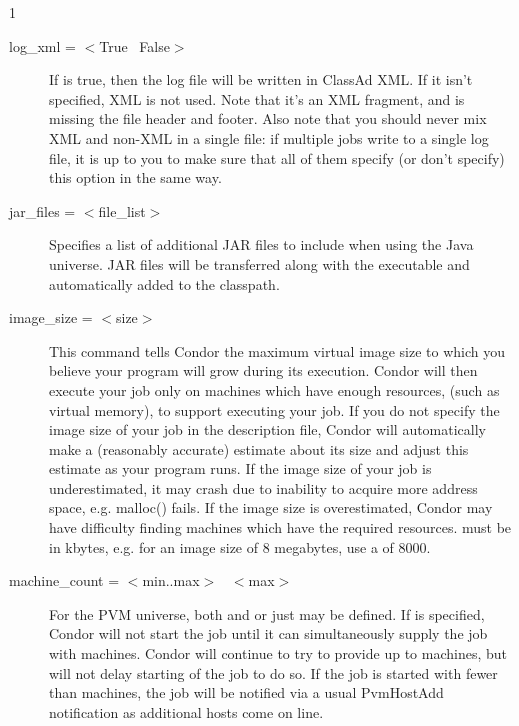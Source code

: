 \begin{ManPage}{\label{man-condor-submit}}{1}
\begin{description}
\item[log\_xml = $<$True \Bar\ False$>$] If  is true, 
then the log file will be written in ClassAd XML. If it isn't
specified, XML is not used. Note that it's an XML fragment, and is
missing the file header and footer. Also note that you should never
mix XML and non-XML in a single file: if multiple jobs write to a
single log file, it is up to you to make sure that all of them specify
(or don't specify) this option in the same way.


\item[jar\_files = $<$file\_list$>$]
Specifies a list of additional JAR files to include when using
the Java universe.  JAR files will be transferred along with
the executable and automatically added to the classpath.


\item[image\_size = $<$size$>$] This command tells Condor the maximum
virtual image size to which you believe your program will grow during
its execution. Condor will then execute your job only on machines which
have enough resources, (such as virtual memory), to support executing
your job. If you do not specify the image size of your job in the
description file, Condor will automatically make a (reasonably accurate)
estimate about its size and adjust this estimate as your program runs.
If the image size of your job is underestimated, it may crash due to
inability to acquire more address space, e.g. malloc() fails. If the image
size is overestimated, Condor may have difficulty finding machines which
have the required resources.  must be in kbytes, e.g. for
an image size of 8 megabytes, use a  of 8000.


\item[machine\_count = $<$min..max$>$ \Bar\ $<$max$>$] 
For the PVM universe,
both  and  or just
 may be defined. 
If  is
specified, Condor will not start the job until it can simultaneously
supply the job with  machines.  Condor will continue to try 
to provide up
to  machines, but will not delay starting of the job to do so.
If the job is started with fewer than  machines, the job
will be notified via a usual PvmHostAdd notification as additional
hosts come on line.


\end{description}
\end{ManPage}

